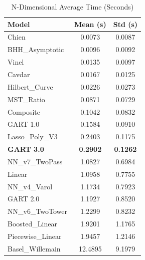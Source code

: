 \documentclass[11pt, a4paper]{article}
\begin{document}
\begin{table}[H]
    \centering
    \caption{N-Dimensional Average Time (Seconds)}
    \label{tab:ndim_avg_time}
    \begin{tabular}{lS[table-format=2.4]S[table-format=2.4]}
        \toprule
        \textbf{Model} & {\textbf{Mean (s)}} & {\textbf{Std (s)}} \\
        \midrule
        Chien & 0.0073 & 0.0087 \\
        BHH\_Asymptotic & 0.0096 & 0.0092 \\
        Vinel & 0.0135 & 0.0097 \\
        Cavdar & 0.0167 & 0.0125 \\
        Hilbert\_Curve & 0.0226 & 0.0273 \\
        MST\_Ratio & 0.0871 & 0.0729 \\
        Composite & 0.1042 & 0.0832 \\
        GART 1.0 & 0.1584 & 0.0910 \\
        Lasso\_Poly\_V3 & 0.2403 & 0.1175 \\
        \textbf{GART 3.0} & \textbf{0.2902} & \textbf{0.1262} \\
        NN\_v7\_TwoPass & 1.0827 & 0.6984 \\
        Linear & 1.0958 & 0.7755 \\
        NN\_v4\_Varol & 1.1734 & 0.7923 \\
        GART 2.0 & 1.1927 & 0.8520 \\
        NN\_v6\_TwoTower & 1.2299 & 0.8232 \\
        Boosted\_Linear & 1.9201 & 1.1765 \\
        Piecewise\_Linear & 1.9457 & 1.2146 \\
        Basel\_Willemain & 12.4895 & 9.1979 \\
        \bottomrule
    \end{tabular}
\end{table}
\end{document}
